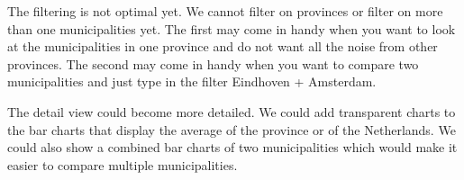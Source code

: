 		The filtering is not optimal yet.
		We cannot filter on provinces or filter on more than one municipalities yet.
		The first may come in handy when you want to look at the municipalities in one province and do not want all the noise from other provinces.
		The second may come in handy when you want to compare two municipalities and just type in the filter Eindhoven + Amsterdam.

		The detail view could become more detailed. We could add  transparent charts to the bar charts that display the average of the province or of the Netherlands.
		We could also show a combined bar charts of two municipalities which would make it easier to compare multiple municipalities.
